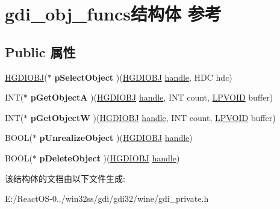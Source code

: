 \hypertarget{structgdi__obj__funcs}{}\section{gdi\+\_\+obj\+\_\+funcs结构体 参考}
\label{structgdi__obj__funcs}
\subsection*{Public 属性}
\begin{DoxyCompactItemize}
\item 
\mbox{\label{structgdi__obj__funcs_a61210d3f4d3d368e0b8e8067bf30abf2}} 
\hyperlink{interfacevoid}{H\+G\+D\+I\+O\+BJ}($\ast$ {\bfseries p\+Select\+Object} )(\hyperlink{interfacevoid}{H\+G\+D\+I\+O\+BJ} \hyperlink{structhandle}{handle}, H\+DC hdc)
\item 
\mbox{\label{structgdi__obj__funcs_a40371258ba293be9c38a62377e05338a}} 
I\+NT($\ast$ {\bfseries p\+Get\+ObjectA} )(\hyperlink{interfacevoid}{H\+G\+D\+I\+O\+BJ} \hyperlink{structhandle}{handle}, I\+NT count, \hyperlink{interfacevoid}{L\+P\+V\+O\+ID} buffer)
\item 
\mbox{\label{structgdi__obj__funcs_aaddb9493abc15e1ff5c15fe287928c13}} 
I\+NT($\ast$ {\bfseries p\+Get\+ObjectW} )(\hyperlink{interfacevoid}{H\+G\+D\+I\+O\+BJ} \hyperlink{structhandle}{handle}, I\+NT count, \hyperlink{interfacevoid}{L\+P\+V\+O\+ID} buffer)
\item 
\mbox{\label{structgdi__obj__funcs_a3143ef086d00353a199f0c55b5c887c3}} 
B\+O\+OL($\ast$ {\bfseries p\+Unrealize\+Object} )(\hyperlink{interfacevoid}{H\+G\+D\+I\+O\+BJ} \hyperlink{structhandle}{handle})
\item 
\mbox{\label{structgdi__obj__funcs_a10a3ad60aab0e2e3d40e563ebc998ca7}} 
B\+O\+OL($\ast$ {\bfseries p\+Delete\+Object} )(\hyperlink{interfacevoid}{H\+G\+D\+I\+O\+BJ} \hyperlink{structhandle}{handle})
\end{DoxyCompactItemize}


该结构体的文档由以下文件生成\+:\begin{DoxyCompactItemize}
\item 
E\+:/\+React\+O\+S-\/0../win32ss/gdi/gdi32/wine/gdi\+\_\+private.\+h\end{DoxyCompactItemize}
